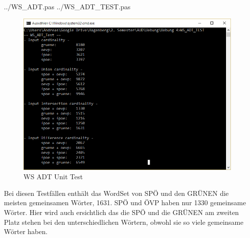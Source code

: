 \documentclass[a4papr,12pt]{article}
\begin{document}
 {../WS_ADT.pas}
 {../WS_ADT_TEST.pas}
\begin{figure}[H]
	\centering
	\includegraphics[scale=0.8]{./pictures/3.png}
	\caption{WS ADT Unit Test}
	\label{fig: Matching}
\end{figure}
\raggedright

Bei diesen Testfällen enthält das WordSet von SPÖ und den GRÜNEN die meisten gemeinsamen Wörter, 1631. SPÖ und ÖVP haben \grqq{}nur\grqq{} 1330 gemeinsame Wörter. Hier wird auch ersichtlich das die SPÖ und die GRÜNEN am zweiten Platz stehen bei den unterschiedlichen Wörtern, obwohl sie so viele gemeinsame Wörter haben.
\end{document}
